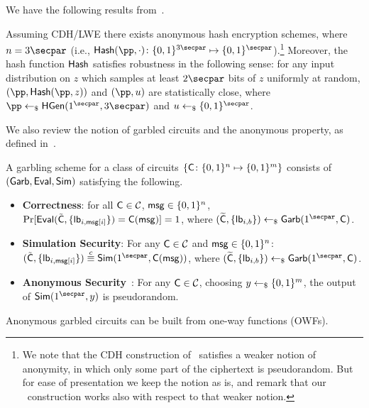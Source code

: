 We have the following results from~\cite{EC:BLSV18,EC:GarGayHaj19}.

\begin{lemma}\label{Lemma:BLSVAnonHash}
Assuming CDH/LWE there exists anonymous hash encryption schemes, where $n = 3\secpar$ (i.e.,  $\Hash(\pp, \cdot) \colon \bits^{3 \secpar} \mapsto \bits^\secpar$).\footnote{We note that  the CDH construction of~\cite{EC:BLSV18} satisfies a weaker notion of anonymity, in which only some part of the ciphertext is pseudorandom. But for ease of presentation we keep the notion as is, and remark that  our \ePSI~construction works also with respect to that weaker notion.} Moreover, the hash function $\mathsf{Hash}$ satisfies robustness in the following sense: for any input distribution on $z$ which samples at least $2 \secpar $ bits of $z$ uniformly at random, $(\pp, \Hash(\pp, z)) $ and $ (\pp, u)$ are statistically close, where $\pp \pick \HGen(1^\secpar,  3 \secpar)$ and $u \pick \bits^\secpar$.
\end{lemma}



We also review the notion of garbled circuits and the anonymous property, as defined in~\cite{EC:BLSV18}.

\begin{definition}
A garbling scheme for a class of circuits $\{ \mathsf{C} \colon \{0,1\}^n \mapsto \{0,1\}^m \}$ consists of $(\mathsf{Garb},\mathsf{Eval}, \mathsf{Sim})$ satisfying the following.
\begin{itemize}
    \item \textbf{Correctness}: for all $\mathsf{C} \in \mathcal{C}$, $\mathsf{msg} \in \{0,1\}^n$, $\Pr[\mathsf{Eval}(\tilde{\mathsf{C}}, \{ \mathsf{lb}_{i , \mathsf{msg}[i]} \}) = \mathsf{C}(\mathsf{msg})] = 1$, where  $(\wt{\al{C}} , \{ \lb_{i,b} \}) \pick \Garb(1^\secpar,\al{C})$.
    \item \textbf{Simulation Security}: For any $\mathsf{C} \in \mathcal{C}$ and $\mathsf{msg} \in \{0,1\}^n$: $(\tilde{\al{C}}, \{ \lb_{i , \msg[i]} \}) \comp \Sim(1^\secpar, \al{C}(\msg))$, where $(\wt{\al{C}} , \{ \lb_{i,b} \}) \pick \Garb(1^\secpar,\al{C})$.
    \item \textbf{Anonymous Security}~\cite{EC:BLSV18}: For any $\mathsf{C} \in \mathcal{C}$, choosing $y \leftarrow_\$ \{0,1\}^m$,  the output of $\Sim(1^\secpar, y)$ is pseudorandom.
\end{itemize}
\end{definition}




\begin{lemma}\label{Lemma:BLSVGC}
Anonymous garbled circuits can be built from  one-way functions (OWFs).
\end{lemma}




